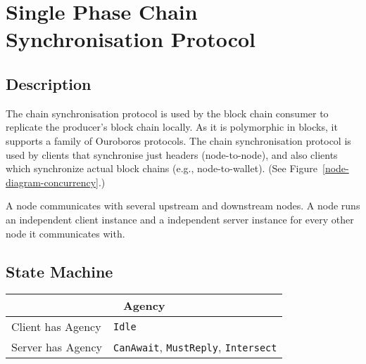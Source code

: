 \documentclass{report}
\newcommand{\hsref}[1]{}
\newcommand{\hsref}[1]
                    {\href{https://github.com/input-output-hk/ouroboros-network/blob/master/#1}
                      {\emph{Haskell source: #1}}}
\newcommand{\state}[1]{\texttt{#1}}
\newcommand{\msg}[1]{\texttt{#1}}
\newcommand{\Idle}{\state{Idle}}
\theoremstyle{definition}{
  \newtheorem{lemma}{Lemma}[section] %
  \newtheorem{definition}[lemma]{Definition}
}
\theoremstyle{theorem}{
  \newtheorem{invariant}[lemma]{Invariant}
  \newtheorem{proofobligation}[lemma]{Proof Obligation}
}
\numberwithin{equation}{lemma}
\begin{document}
\section{Single Phase Chain Synchronisation Protocol}
\label{chain-sync-protocol}
\hsref{ouroboros-network/src/Ouroboros/Network/Protocol/ChainSync/Type.hs}
\newcommand{\CanAwait}{\state{CanAwait}}
\newcommand{\MustReply}{\state{MustReply}}
\newcommand{\Intersect}{\state{Intersect}}
\newcommand{\RequestNext}{\msg{RequestNext}}
\newcommand{\AwaitReply}{\msg{AwaitReply}}
\newcommand{\RollForward}{\msg{RollForward}}
\newcommand{\RollBackward}{\msg{RollBackward}}
\newcommand{\FindIntersect}{\msg{FindIntersect}}
\newcommand{\IntersectFound}{\msg{IntersectFound}}
\newcommand{\IntersectNotFound}{\msg{IntersectNotFound}}

\subsection{Description}
The chain synchronisation protocol is used by the block chain consumer
to replicate the producer's block chain locally. As it is polymorphic in blocks,
it supports a family of Ouroboros protocols.
The chain synchronisation protocol is used by clients that synchronise just headers (node-to-node),
and also clients which synchronize actual block chains (e.g., node-to-wallet).
(See Figure~\ref{node-diagram-concurrency}.)

A node communicates with several upstream and downstream nodes.
A node runs an independent client instance and a independent server instance for every
other node it communicates with.

\subsection{State Machine}

\begin{tabular}{|l|l|}
  \hline
  \multicolumn{2}{|c|}{Agency} \\ \hline
  Client has Agency & \Idle \\  \hline
  Server has Agency & \CanAwait, \MustReply, \Intersect \\ \hline
\end{tabular}
\end{document}
